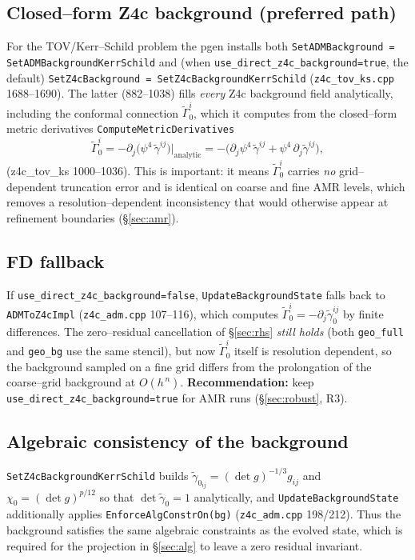 \documentclass[11pt]{article}
\newcommand{\code}[1]{\texttt{#1}}
\newcommand{\file}[1]{\texttt{#1}}
\newcommand{\gt}{\tilde\gamma}
\newcommand{\Gamt}{\tilde\Gamma}
\newcommand{\bg}[1]{#1_{0}}
\begin{document}
\subsection{Closed--form Z4c background (preferred path)}
For the TOV/Kerr--Schild problem the pgen installs both
\code{SetADMBackground = SetADMBackgroundKerrSchild} and (when
\code{use\_direct\_z4c\_background=true}, the default)
\code{SetZ4cBackground = SetZ4cBackgroundKerrSchild}
(\file{z4c\_tov\_ks.cpp} 1688--1690). The latter (882--1038) fills
\emph{every} Z4c background field analytically, including the conformal
connection $\bg{\Gamt}^i$, which it computes from the closed--form metric
derivatives \code{ComputeMetricDerivatives}
\begin{equation}
  \bg{\Gamt}^i = -\partial_j\bigl(\psi^{4}\,\gt^{ij}\bigr)\Big|_{\text{analytic}}
  = -\bigl(\partial_j\psi^4\,\gt^{ij} + \psi^4\,\partial_j\gt^{ij}\bigr),
  \label{eq:Gambg}
\end{equation}
(z4c\_tov\_ks 1000--1036). This is important: it means $\bg{\Gamt}^i$ carries
\emph{no} grid--dependent truncation error and is identical on coarse and fine
AMR levels, which removes a resolution--dependent inconsistency that would
otherwise appear at refinement boundaries (\S\ref{sec:amr}).

\subsection{FD fallback}
If \code{use\_direct\_z4c\_background=false}, \code{UpdateBackgroundState}
falls back to \code{ADMToZ4cImpl} (\file{z4c\_adm.cpp} 107--116), which
computes $\bg{\Gamt}^i=-\partial_j\bg{\gt}^{ij}$ by finite differences. The
zero--residual cancellation of \S\ref{sec:rhs} \emph{still holds} (both
\code{geo\_full} and \code{geo\_bg} use the same stencil), but now
$\bg{\Gamt}^i$ itself is resolution dependent, so the background sampled on a
fine grid differs from the prolongation of the coarse--grid background at
$O(h^{\,n})$. \textbf{Recommendation:} keep
\code{use\_direct\_z4c\_background=true} for AMR runs (\S\ref{sec:robust}, R3).

\subsection{Algebraic consistency of the background}
\code{SetZ4cBackgroundKerrSchild} builds $\bg{\gt}_{ij}=(\det g)^{-1/3}g_{ij}$
and $\bg\chi=(\det g)^{p/12}$ so that $\det\bg{\gt}=1$ analytically, and
\code{UpdateBackgroundState} additionally applies
\code{EnforceAlgConstrOn(bg)} (\file{z4c\_adm.cpp} 198/212). Thus the
background satisfies the same algebraic constraints as the evolved state,
which is required for the projection in \S\ref{sec:alg} to leave a zero
residual invariant.
\end{document}
